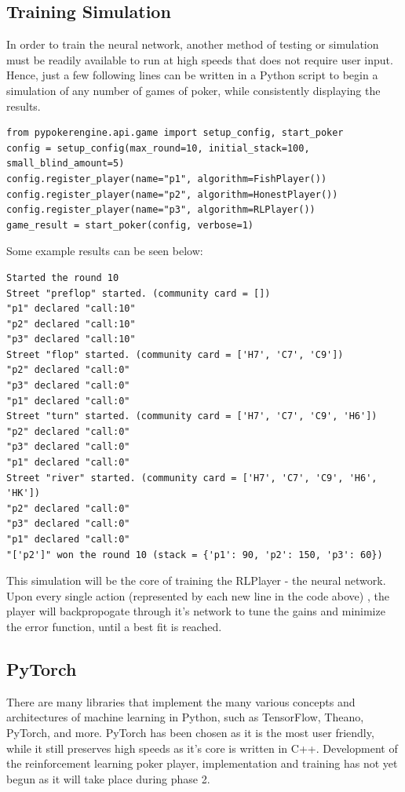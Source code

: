 \documentclass[12pt]{article}
\begin{document}
\subsection{Training Simulation}
In order to train the neural network, another method of testing or simulation must be readily available to run at high speeds that does not require user input. Hence, just a few following lines can be written in a Python script to begin a simulation of any number of games of poker, while consistently displaying the results.
\begin{verbatim}
from pypokerengine.api.game import setup_config, start_poker
config = setup_config(max_round=10, initial_stack=100, small_blind_amount=5)
config.register_player(name="p1", algorithm=FishPlayer())
config.register_player(name="p2", algorithm=HonestPlayer())
config.register_player(name="p3", algorithm=RLPlayer())
game_result = start_poker(config, verbose=1)
\end{verbatim}
Some example results can be seen below:
\begin{verbatim}
Started the round 10
Street "preflop" started. (community card = [])
"p1" declared "call:10"
"p2" declared "call:10"
"p3" declared "call:10"
Street "flop" started. (community card = ['H7', 'C7', 'C9'])
"p2" declared "call:0"
"p3" declared "call:0"
"p1" declared "call:0"
Street "turn" started. (community card = ['H7', 'C7', 'C9', 'H6'])
"p2" declared "call:0"
"p3" declared "call:0"
"p1" declared "call:0"
Street "river" started. (community card = ['H7', 'C7', 'C9', 'H6', 'HK'])
"p2" declared "call:0"
"p3" declared "call:0"
"p1" declared "call:0"
"['p2']" won the round 10 (stack = {'p1': 90, 'p2': 150, 'p3': 60})
\end{verbatim}
This simulation will be the core of training the RLPlayer - the neural network. Upon every single action (represented by each new line in the code above) , the player will backpropogate through it's network to tune the gains and minimize the error function, until a best fit is reached.
\subsection{PyTorch}
There are many libraries that implement the many various concepts and architectures of machine learning in Python, such as TensorFlow, Theano, PyTorch, and more. PyTorch has been chosen as it is the most user friendly, while it still preserves high speeds as it's core is written in C++. Development of the reinforcement learning poker player, implementation and training has not yet begun as it will take place during phase 2.
\end{document}
